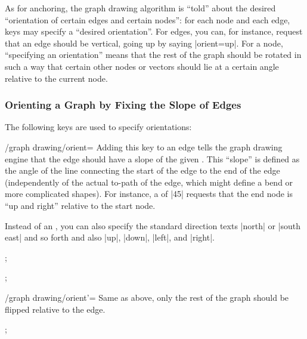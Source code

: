 As for anchoring, the graph drawing algorithm is ``told'' about
the desired ``orientation of certain edges and certain nodes'': for
each node and each edge, keys may specify a ``desired
orientation''. For edges, you can, for instance, request that an
edge should be vertical, going up by saying |orient=up|. For a
node, ``specifying an orientation'' means that the rest of the graph
should be rotated in such a way that certain other nodes or
vectors should lie at a certain angle relative to the current node.


\subsubsection{Orienting a Graph by Fixing the Slope of Edges}

The following keys are used to specify orientations:
\begin{key}{/graph drawing/orient=}
  Adding this key to an edge tells the graph drawing engine that the
  edge should have a slope of the given . This ``slope''
  is defined as the angle of the line connecting the start of the edge
  to the end of the edge (independently of the actual to-path of the
  edge, which might define a bend or more complicated shapes). For
  instance, a  of |45| requests that the end node is ``up
  and right'' relative to the start node.
  
  Instead of an , you can also specify the standard
  direction texts |north| or |south east| and so forth and also
  |up|, |down|, |left|, and |right|.
    
\begin{codeexample}[]
\tikz {};
\end{codeexample}
\begin{codeexample}[]
\tikz {};
\end{codeexample}
\end{key}

\begin{key}{/graph drawing/orient'=}
  Same as above, only the rest of the graph should be flipped relative
  to the edge.
    
\begin{codeexample}[]
\tikz {};
\end{codeexample}
\end{key}


